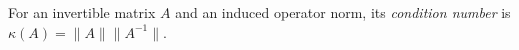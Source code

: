 
For an invertible matrix $A$ and an induced operator norm, its \emph{condition number} is $\kappa(A)=\|A\|\|A^{-1}\|$.
